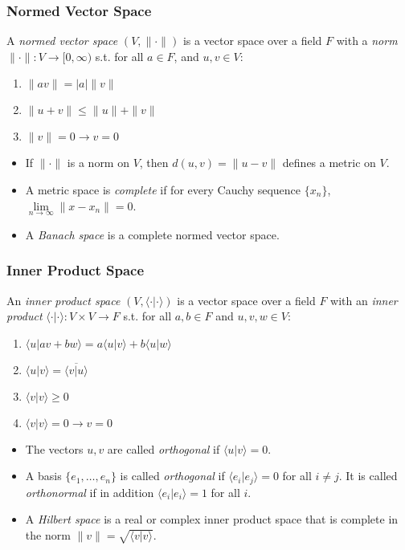 \documentclass[UTF8,11pt,colorlinks,compress,openany]{beamer}%
\begin{document}
\begin{frame}\frametitle{Normed Vector Space}
	\begin{definition}
		A \emph{normed vector space} $(V,\|\cdot\|)$ is a vector space over a field $F$ with a \emph{norm} $\|\cdot\|: V\to[0,\infty)$ s.t. for all $a\in F$, and $u,v\in V$:
		\begin{enumerate}
			\item $\|av\|=|a|\|v\|$
			\item $\|u+v\|\leq \|u\|+\|v\|$
			\item $\|v\|=0\to v=0$
		\end{enumerate}
	\end{definition}
\begin{itemize}
	\item If $\|\cdot\|$ is a norm on $V$, then $d(u,v)=\|u-v\|$ defines a metric on $V$.
	\item A metric space is \emph{complete} if for every Cauchy sequence $\{x_n\}$, $\lim\limits_{n\to\infty}\|x-x_n\|=0$.
	\item A \emph{Banach space} is a complete normed vector space.
\end{itemize}
\end{frame}

\begin{frame}\frametitle{Inner Product Space}
	\begin{definition}
		An \emph{inner product space} $(V,\langle\cdot|\cdot\rangle)$ is a vector space over a field $F$ with an \emph{inner product} $\langle\cdot|\cdot\rangle:V\times V\to F$ s.t. for all $a,b\in F$ and $u,v,w\in V$:
		\begin{enumerate}
			\item $\langle u|av+bw\rangle=a\langle u|v\rangle+b\langle u|w\rangle$
			\item $\langle u|v\rangle=\overline{\langle v|u\rangle}$
			\item $\langle v|v\rangle\geq 0$
			\item $\langle v|v\rangle=0\to v=0$
		\end{enumerate}
	\end{definition}
	\begin{itemize}
		\item The vectors $u,v$ are called \emph{orthogonal} if $\langle u|v\rangle=0$.
		\item A basis $\{e_1,\dots,e_n\}$ is called \emph{orthogonal} if $\langle e_i|e_j\rangle=0$ for all $i\ne j$. It is called \emph{orthonormal} if in addition $\langle e_i|e_i\rangle=1$ for all $i$.
		\item A \emph{Hilbert space} is a real or complex inner product space that is complete in the norm $\|v\|=\sqrt{\langle v|v\rangle}$.
	\end{itemize}
\end{frame}
\end{document}
